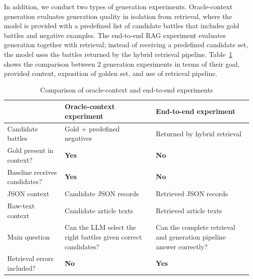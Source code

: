 In addition, we conduct two types of generation experiments. Oracle-context generation evaluates generation quality in isolation from retrieval, where the model is provided with a predefined list of candidate battles that includes gold battles and negative examples. The end-to-end RAG experiment evaluates generation together with retrieval; instead of receiving a predefined candidate set, the model uses the battles returned by the hybrid retrieval pipeline. Table~\ref{tab:oracle_vs_e2e} shows the comparison between 2 generation experiments in terms of their goal, provided context, exposition of golden set, and use of retrieval pipeline.
\begin{table}[htbp]
    \centering
    \caption{Comparison of oracle-context and end-to-end experiments}
    \label{tab:oracle_vs_e2e}

    \small
    \renewcommand{\arraystretch}{1.4}
    \setlength{\tabcolsep}{5pt}

    \begin{tabular}{
        p{}
        p{}
        p{}
    }
        \toprule
        &
        \textbf{Oracle-context experiment} &
        \textbf{End-to-end experiment} \\
        \midrule

        Candidate battles &
        Gold + predefined negatives &
        Returned by hybrid retrieval \\
        \midrule

        Gold present in context? &
        \textbf{Yes} &
        \textbf{No} \\
        \midrule

        Baseline receives candidates? &
        \textbf{Yes} &
        \textbf{No} \\
        \midrule

        JSON context &
        Candidate JSON records &
        Retrieved JSON records \\
        \midrule

        Raw-text context &
        Candidate article texts &
        Retrieved article texts \\
        \midrule

        Main question &
        Can the LLM select the right battles given correct candidates? &
        Can the complete retrieval and generation pipeline answer correctly? \\
        \midrule

        Retrieval errors included? &
        \textbf{No} &
        \textbf{Yes} \\

        \bottomrule
    \end{tabular}
\end{table}
